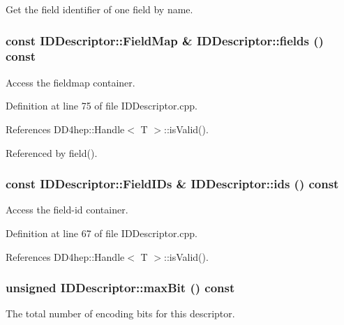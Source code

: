 Get the field identifier of one field by name. \hypertarget{class_d_d4hep_1_1_geometry_1_1_i_d_descriptor_ac9ac7cfabcfd6f2751cbdb7197404e7c}{
\subsubsection[{fields}]{\setlength{\rightskip}{0pt plus 5cm}const {\bf IDDescriptor::FieldMap} \& IDDescriptor::fields () const}}
\label{class_d_d4hep_1_1_geometry_1_1_i_d_descriptor_ac9ac7cfabcfd6f2751cbdb7197404e7c}


Access the fieldmap container. 

Definition at line 75 of file IDDescriptor.cpp.

References DD4hep::Handle$<$ T $>$::isValid().

Referenced by field().\hypertarget{class_d_d4hep_1_1_geometry_1_1_i_d_descriptor_a76229b96b002d0d33641ff79560f74c9}{
\subsubsection[{ids}]{\setlength{\rightskip}{0pt plus 5cm}const {\bf IDDescriptor::FieldIDs} \& IDDescriptor::ids () const}}
\label{class_d_d4hep_1_1_geometry_1_1_i_d_descriptor_a76229b96b002d0d33641ff79560f74c9}


Access the field-\/id container. 

Definition at line 67 of file IDDescriptor.cpp.

References DD4hep::Handle$<$ T $>$::isValid().\hypertarget{class_d_d4hep_1_1_geometry_1_1_i_d_descriptor_a7a124ef5647a1c5f090c3a60cc4057d6}{
\subsubsection[{maxBit}]{\setlength{\rightskip}{0pt plus 5cm}unsigned IDDescriptor::maxBit () const}}
\label{class_d_d4hep_1_1_geometry_1_1_i_d_descriptor_a7a124ef5647a1c5f090c3a60cc4057d6}


The total number of encoding bits for this descriptor. 

